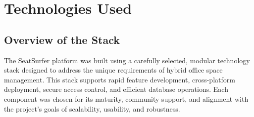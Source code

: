 \documentclass[12pt,a4paper]{report} %
\begin{document}
\section{Technologies Used}

\subsection{Overview of the Stack}

The SeatSurfer platform was built using a carefully selected, modular technology stack designed to address the unique requirements of hybrid office space management. This stack supports rapid feature development, cross-platform deployment, secure access control, and efficient database operations. Each component was chosen for its maturity, community support, and alignment with the project's goals of scalability, usability, and robustness.
\end{document}
